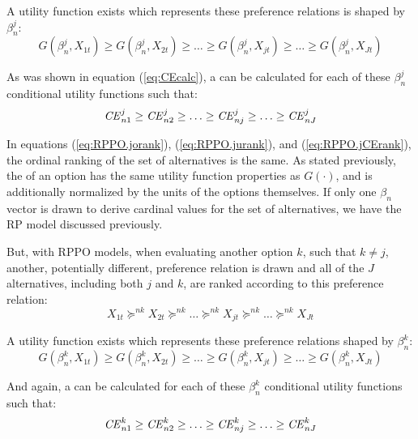 \noindent A utility function exists which represents these preference relations is shaped by $\beta_n^j$:
\begin{equation}
	\label{eq:RPPO.jurank}
	G(\beta_n^j,X_{1t}) \geq G(\beta_n^j,X_{2t}) \geq \ldots \geq G(\beta_n^j,X_{jt}) \geq \ldots \geq G(\beta_n^j,X_{Jt})
\end{equation}

As was shown in equation (\ref{eq:CEcalc}), a {\CE} can be calculated for each of these $\beta_n^j$ conditional utility functions such that:
\begin{equation}
	\label{eq:RPPO.jCErank}
	{\ensuremath{\mathit{CE}}}^j_{n1} \geq {\ensuremath{\mathit{CE}}}^j_{n2} \geq \ldots \geq {\ensuremath{\mathit{CE}}}^j_{nj} \geq \ldots \geq {\ensuremath{\mathit{CE}}}^j_{nJ}
\end{equation}

In equations (\ref{eq:RPPO.jorank}), (\ref{eq:RPPO.jurank}), and (\ref{eq:RPPO.jCErank}), the ordinal ranking of the set of alternatives is the same.
As stated previously, the {\CE} of an option has the same utility function properties as $G(\cdot)$, and is additionally normalized by the units of the options themselves.
If only one $\beta_n$ vector is drawn to derive cardinal values for the set of alternatives, we have the RP model discussed previously.

But, with RPPO models, when evaluating another option $k$, such that $k \neq j$, another, potentially different, preference relation is drawn and all of the $J$ alternatives, including both $j$ and $k$, are ranked according to this preference relation:
\begin{equation}
	\label{eq:RPPO.korank}
	X_{1t} \succcurlyeq^{nk} X_{2t} \succcurlyeq^{nk} \ldots \succcurlyeq^{nk} X_{jt} \succcurlyeq^{nk} \ldots \succcurlyeq^{nk} X_{Jt}
\end{equation}

\noindent A utility function exists which represents these preference relations shaped by $\beta_n^k$:
\begin{equation}
	\label{eq:RPPO.kurank}
	G(\beta_n^k,X_{1t}) \geq G(\beta_n^k,X_{2t}) \geq \ldots \geq G(\beta_n^k,X_{jt}) \geq \ldots \geq G(\beta_n^k,X_{Jt})
\end{equation}

\noindent And again, a {\CE} can be calculated for each of these $\beta_n^k$ conditional utility functions such that:
\begin{equation}
	\label{eq:RPPO.kCErank}
	{\ensuremath{\mathit{CE}}}^k_{n1} \geq {\ensuremath{\mathit{CE}}}^k_{n2} \geq \ldots \geq {\ensuremath{\mathit{CE}}}^k_{nj} \geq \ldots \geq {\ensuremath{\mathit{CE}}}^k_{nJ}
\end{equation}

